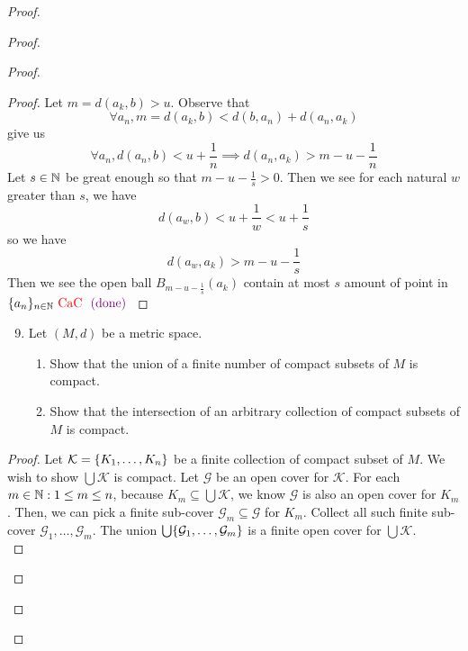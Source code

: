 \documentclass{report}
\begin{document}
\begin{proof}
\begin{proof}
\begin{proof}
\begin{proof}
Let $m=d(a_k,b)>u$. Observe that 
\begin{equation}
\forall a_n,m=d(a_k,b)<d(b,a_n)+d(a_n,a_k)
\end{equation}
give us
\begin{equation}
\forall a_n, d(a_n,b)<u+\frac{1}{n}\implies d(a_n,a_k)>m-u-\frac{1}{n}
\end{equation}
Let $s\in\mathbb{N}$ be great enough so that  $m-u-\frac{1}{s}>0$. Then we see for each natural $w$ greater than  $s$, we have
 \begin{equation}
d(a_w,b)<u+\frac{1}{w}<u+\frac{1}{s}
\end{equation}
so we have
\begin{equation}
d(a_w,a_k)>m-u-\frac{1}{s}
\end{equation}
Then we see the open ball $B_{m-u-\frac{1}{s}}(a_k)$ contain at most $s$ amount of point in  $\{ a_n \}_{n\in\mathbb{N}}\text{ \textcolor{red}{CaC} }\textcolor{violet}{\text{ (done) }}$
















\end{proof}
\begin{question}{}{}
\begin{enumerate}
    \setcounter{enumi}{8}
    \item Let \( (M, d) \) be a metric space.
    \begin{enumerate}
        \item Show that the union of a finite number of compact subsets of \( M \) is compact.
        \item Show that the intersection of an arbitrary collection of compact subsets of \( M \) is compact.
    \end{enumerate}
\end{enumerate}
\end{question}
\begin{proof}
  Let $\mathcal{K}=\{ K_1,\dots , K_n \}$ be a finite collection of compact subset of $M$. We wish to show $\bigcup  \mathcal{K}$ is compact. Let $\mathcal{G}$ be an open cover for $\mathcal{K}$. For each $m \in\mathbb{N}:1\leq m\leq n$, because $K_m\subseteq \bigcup \mathcal{K}$, we know $\mathcal{G}$ is also an open cover for $K_m$. Then, we can pick a finite sub-cover  $\mathcal{G}_m\subseteq \mathcal{G}$ for $K_m$. Collect all such finite sub-cover  $\mathcal{G}_1,\dots, \mathcal{G}_m$. The union $\bigcup \{ \mathcal{G}_1,\dots ,\mathcal{G}_m \}$ is a finite open cover for $\bigcup \mathcal{K} $.\\


\end{proof}
\end{proof}
\end{proof}
\end{proof}
\end{document}
